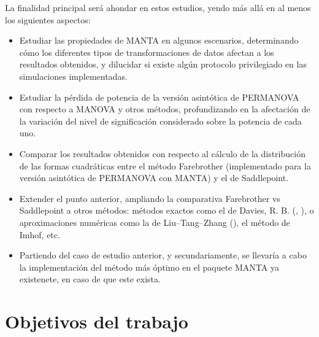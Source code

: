 \documentclass[IB,BIB]{TFUOC}%
\begin{document}
La finalidad principal será ahondar en estos estudios, yendo más allá en al menos los siguientes aspectos:

{\small
\begin{itemize}
    \item Estudiar las propiedades de MANTA en algunos escenarios, determinando cómo los diferentes tipos de transformaciones de datos afectan a los resultados obtenidos, y dilucidar si existe algún protocolo privilegiado en las simulaciones implementadas.
    \item Estudiar la pérdida de potencia de la versión asintótica de PERMANOVA con respecto a MANOVA y otros métodos, profundizando en la afectación de la variación del nivel de significación considerado sobre la potencia de cada uno.
    \item Comparar los resultados obtenidos con respecto al cálculo de la distribución de las formas cuadráticas entre el método Farebrother (implementado para la versión asintótica de PERMANOVA con MANTA) y el de Saddlepoint.
    \item Extender el punto anterior, ampliando la comparativa Farebrother vs Saddlepoint a otros métodos: métodos exactos como el de Davies, R. B. (\cite{davies_numerical_1973}, \cite{davies_algorithm_1980}), o aproximaciones numéricas como la de Liu–Tang–Zhang (\cite{qi_genetic_2022}), el método de Imhof, etc.
    \item Partiendo del caso de estudio anterior, y secundariamente, se llevaría a cabo la implementación del método más óptimo en el paquete MANTA ya existenete, en caso de que este exista.
\end{itemize}}


\section{Objetivos del trabajo}



%
\end{document}
